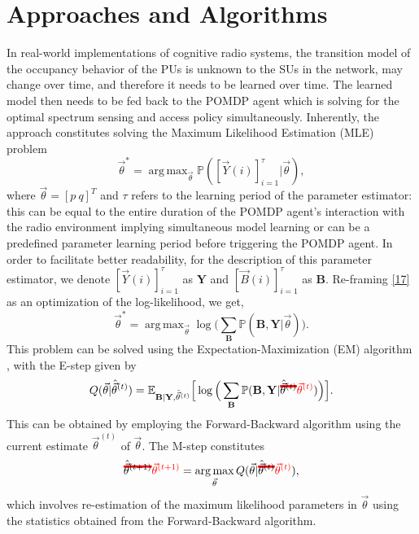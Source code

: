 \documentclass[10pt,twocolumn]{IEEEtran}
\DeclareMathOperator*{\argmax}{arg\,max}
\newcommand\mst[2][red]{\setbox0=\hbox{$#2$}\rlap{\raisebox{.45\ht0}{\textcolor{#1}{\rule{\wd0}{2pt}}}}#2}
\newcommand{\add}[1]{{\color{red}{#1}}}
\begin{document}
\section{Approaches and Algorithms}\label{III}
In real-world implementations of cognitive radio systems, the transition model of the occupancy behavior of the PUs is unknown to the SUs in the network, may change over time, and therefore it needs to be learned over time. The learned model then needs to be fed back to the POMDP agent which is solving for the optimal spectrum sensing and access policy simultaneously. Inherently, the approach constitutes \add{of} solving the Maximum Likelihood Estimation (MLE) problem
\begin{equation}\label{17}
    \vec{\theta}^{*} = \argmax_{\vec{\theta}} \mathbb{P}([\vec{Y}(i)]_{i=1}^{\tau}|\vec{\theta}),
\end{equation}
where $\vec{\theta}{=}[p\ q]^{T}$ and $\tau$ refers to the learning period of the parameter estimator: this can be equal to the entire duration of the POMDP agent's interaction with the radio environment implying simultaneous model learning or can be a predefined parameter learning period before triggering the POMDP agent. In order to facilitate better readability, for the description of this parameter estimator, we denote $[\vec{Y}(i)]_{i=1}^{\tau}$ as $\mathbf{Y}$ and $[\vec{B}(i)]_{i=1}^{\tau}$ as $\mathbf{B}$. Re-framing \eqref{17} as an optimization of the log-likelihood, we get,
\begin{equation}\label{18}
    \vec{\theta}^{*} = \argmax_{\vec{\theta}} \log\Big(\sum_{\mathbf{B}} \mathbb{P}(\mathbf{B}, \mathbf{Y}| \vec{\theta})\Big).
\end{equation}
This problem can be solved using the Expectation-Maximization (EM) algorithm \cite{778361}, with the E-step given by
\begin{equation}
    Q(\vec{\theta}|\hat{\vec{\theta}}^{(t)}) = \mathbb{E}_{\mathbf{B}|\mathbf{Y}, \hat{\vec{\theta}}^{(t)}} \Big[ \log \Big(\sum_{\mathbf{B}} \mathbb{P}(\mathbf{B}, \mathbf{Y}|\mst{\hat{\vec{\theta}}^{(t)}}\add{\vec{\theta}^{(t)}}) \Big) \Big].
\end{equation}
This can be obtained by employing the Forward-Backward algorithm \cite{778361} using the current estimate $\vec{\theta}^{(t)}$ of $\vec{\theta}$. The M-step constitutes
\begin{equation}
\mst{    \hat{\vec{\theta}}^{(t+1)}}
\add{\vec{\theta}^{(t+1)}}
 = \argmax_{\vec{\theta}} Q(\vec{\theta}|\mst{\hat{\vec{\theta}}^{(t)}}\add{\vec{\theta}^{(t)}}),
\end{equation}
which involves re-estimation of the maximum likelihood parameters in $\vec{\theta}$ using the statistics obtained from the Forward-Backward algorithm.
\end{document}
